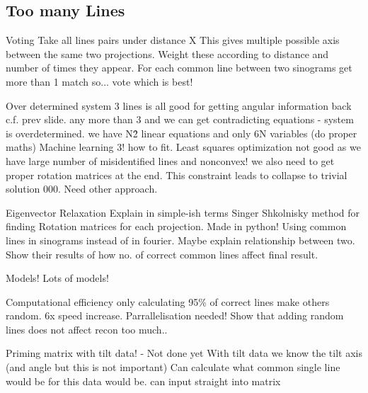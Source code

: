 \documentclass[t, 11pt]{beamer}
\begin{document}
\subsection*{Too many Lines}
\begin{frame}[fragile]{Voting}
  Take all lines pairs under distance X
  This gives multiple possible axis between the same two projections. Weight these according to distance and number of times they appear.
  For each common line between two sinograms get more than 1 match so... vote which is best!
\end{frame}

\begin{frame}[fragile]{Over determined system}
  3 lines is all good for getting angular information back c.f. prev slide.
  any more than 3 and we can get contradicting equations - system is overdetermined. we have N\^2 linear equations and only 6N variables (do proper maths)
  Machine learning 3! how to fit. Least squares optimization not good as we have large number of misidentified lines and nonconvex! we also need to get proper rotation matrices at the end. This constraint leads to collapse to trivial solution 000. Need other approach.
\end{frame}

\begin{frame}[fragile]{Eigenvector Relaxation}
  Explain in simple-ish terms Singer Shkolnisky method for finding Rotation matrices for each projection.
  Made in python! Using common lines in sinograms instead of in fourier. Maybe explain relationship between two. 
  Show their results of how no. of correct common lines affect final result.
\end{frame}

\begin{frame}[fragile]{Models!}
  Lots of models!
\end{frame}

\begin{frame}[fragile]{Computational efficiency}
  only calculating 95\% of correct lines make others random. 6x speed increase. Parrallelisation needed!
  Show that adding random lines does not affect recon too much..
\end{frame}

\begin{frame}[fragile]{Priming matrix with tilt data! - Not done yet}
  With tilt data we know the tilt axis (and angle but this is not important)
  Can calculate what common single line would be for this data would be. can input straight into matrix
\end{frame}
\end{document}
